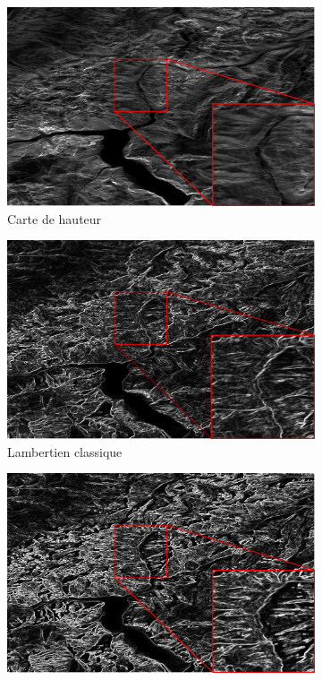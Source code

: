 \begin{figure}[h!]
\centering
 \begin{subfigure}[t]{0.32\linewidth}
 \centering
 \includegraphics[width=1.0\linewidth]{Resultats/gradient_hauteur.png}
 \caption{Carte de hauteur}
 \end{subfigure}
 \begin{subfigure}[t]{0.32\linewidth}
 \centering
 \includegraphics[width=1.0\linewidth]{Resultats/gradient_lambertien.png}
  \caption{Lambertien classique}
 \end{subfigure}
  \begin{subfigure}[t]{0.32\linewidth}
 \centering
 \includegraphics[width=1.0\linewidth]{Resultats/gradient_our.png}

\end{subfigure}
\end{figure}
